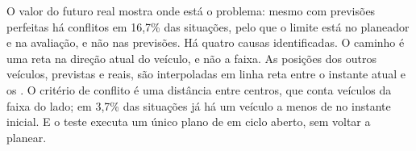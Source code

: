 O valor do futuro real mostra onde está o problema: mesmo com previsões
perfeitas há conflitos em 16,7\% das situações, pelo que o limite está no
planeador e na avaliação, e não nas previsões. Há quatro causas
identificadas. O caminho é uma reta na direção atual do veículo, e não a
faixa. As posições dos outros veículos, previstas e reais, são
interpoladas em linha reta entre o instante atual e os . O
critério de conflito é uma distância entre centros, que conta veículos da
faixa do lado; em 3,7\% das situações já há um veículo a menos de
 no instante inicial. E o teste executa um único plano de
 em ciclo aberto, sem voltar a planear.
